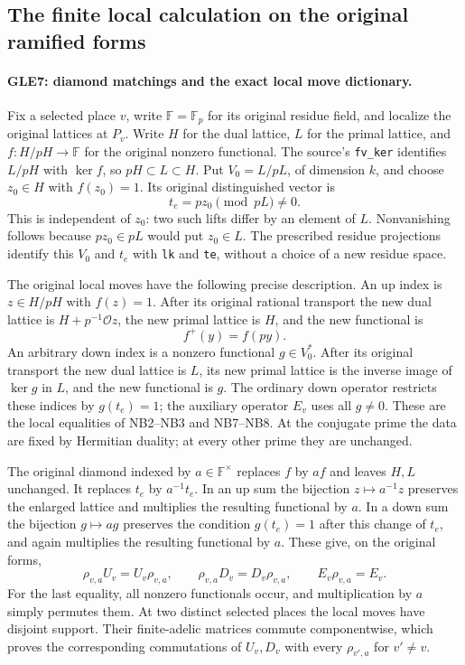 \subsection{The finite local calculation on the original ramified forms}

\paragraph{GLE7: diamond matchings and the exact local move dictionary.}
\label{claim:GLE7}
Fix a selected place $v$, write $\mathbb F=\mathbb F_p$ for its
original residue field, and localize the original lattices at $P_v$.
Write $H$ for the dual lattice, $L$ for the primal lattice, and
$f:H/pH\to\mathbb F$ for the original nonzero functional.  The
source's \texttt{fv\_ker} identifies $L/pH$ with $\ker f$, so
$pH\subset L\subset H$.  Put $V_0=L/pL$, of dimension $k$, and
choose $z_0\in H$ with $f(z_0)=1$.  Its original distinguished vector is
\[
                         t_e=pz_0\pmod {pL}\ne0.                 \tag{GLE.30}
\]
This is independent of $z_0$: two such lifts differ by an element of
$L$.  Nonvanishing follows because $pz_0\in pL$ would put $z_0\in L$.
The prescribed residue projections identify this $V_0$ and $t_e$
with \texttt{lk} and \texttt{te}, without a choice of a new residue
space.

The original local moves have the following precise description.
An up index is $z\in H/pH$ with $f(z)=1$.  After its original rational
transport the new dual lattice is $H+p^{-1}\mathcal O z$, the new
primal lattice is $H$, and the new functional is
\[
                         f^+(y)=f(py).
\]
An arbitrary down index is a nonzero functional $g\in V_0^*$.
After its original transport the new dual lattice is $L$, its new
primal lattice is the inverse image of $\ker g$ in $L$, and the new
functional is $g$.  The ordinary down operator restricts these
indices by $g(t_e)=1$; the auxiliary operator $E_v$ uses all
$g\ne0$.  These are the local equalities of NB2--NB3 and NB7--NB8.
At the conjugate prime the data are fixed by Hermitian duality;
at every other prime they are unchanged.

The original diamond indexed by $a\in\mathbb F^\times$ replaces
$f$ by $af$ and leaves $H,L$ unchanged.  It replaces $t_e$ by
$a^{-1}t_e$.  In an up sum the bijection $z\mapsto a^{-1}z$
preserves the enlarged lattice and multiplies the resulting
functional by $a$.  In a down sum the bijection $g\mapsto ag$
preserves the condition $g(t_e)=1$ after this change of $t_e$, and
again multiplies the resulting functional by $a$.
These give, on the original forms,
\[
 \rho_{v,a}U_v=U_v\rho_{v,a},\qquad
 \rho_{v,a}D_v=D_v\rho_{v,a},\qquad E_v\rho_{v,a}=E_v.          \tag{GLE.31}
\]
For the last equality, all nonzero functionals occur, and multiplication
by $a$ simply permutes them.  At two distinct selected places the
local moves have disjoint support.  Their finite-adelic matrices
commute componentwise, which proves the corresponding commutations
of $U_v,D_v$ with every $\rho_{v',a}$ for $v'\ne v$.

